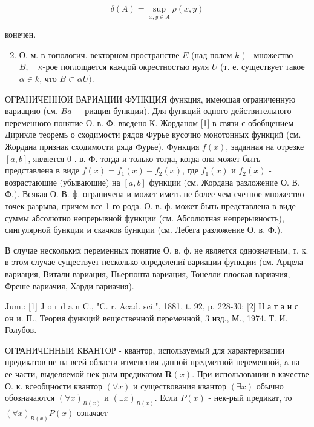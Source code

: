 \documentclass[10pt]{article}
\begin{document}
\[

\delta(A)=\sup _{x, y \in A} \rho(x, y)

\]



конечен.



\begin{enumerate}

  \setcounter{enumi}{1}

  \item О. м. в топологич. векторном пространстве $E$ (над полем $k$ ) - множество $B, \quad \kappa$-рое поглощается каждой окрестностью нуля $U$ (т. е. существует такое $\alpha \in k$, что $B \subset \alpha U)$.

\end{enumerate}



ОГРАНИЧЕННОИ ВАРИАЦИИ ФУНКЦИЯ функция, имеющая ограниченную вариацию (см. $B a-$ риация бункции). Для функций одного действительного переменного понятие О. в. Ф. введено $К$. Жорданом [1] в связи с обобщением Дирихле теоремь о сходимости рядов Фурье кусочно монотонных функций (см. Жордана признак сходимости ряда Фурье). Функция $f(x)$, заданная на отрезке $[a, b]$, является 0 . в. Ф. тогда и только тогда, когда она может быть представлена в виде $f(x)=f_{1}(x)-f_{2}(x)$, где $f_{1}(x)$ и $f_{2}(x)$ - возрастающие (убывающие) на $[a, b]$ функции (см. Жордана разложение О. В. Ф.). Всякая О. В. ф. ограничена и может иметь не более чем счетное множество точек разрыва, причем все 1-го рода. О. в. ф. может быть представлена в виде суммы абсолютно непрерывной функции (см. Абсолютная непрерывность), сингулярной бункции и скачков бункции (см. Лебега разложение О. в. Ф.).



В случае нескольких переменных понятие О. в. ф. не является однозначным, т. к. в этом случае существует несколько определениї вариации функции (см. Арцела вариация, Витали вариация, Пьерпонта вариация, Тонелли плоская вариачия, Фреше вариачия, Харди вариачия).



Jum.: [1] J o r d a n C., "C. r. Acad. sci.", 1881, t. 92, p. 228-30; [2] Н а т а н с он и. П., Теория функций вещественной переменной, 3 изд., М., 1974. Т. И. Голубов.



ОГРАНИЧЕННЫИ КВАНТОР - квантор, используемый для характеризации предикатов не на всей области изменения данной предметной переменной, a на ее части, выделяемой нек-рым предикатом $\boldsymbol{R}(x)$. При использовании в качестве О. к. всеобцности квантор $(\forall x)$ и существования квантор $(\exists x)$ обычно обозначаются $(\forall x)_{R(x)}$ и $(\exists x)_{R(x)}$. Если $P(x)$ - нек-рый предикат, то $(\forall x)_{R(x)} P(x)$ означает
\end{document}
